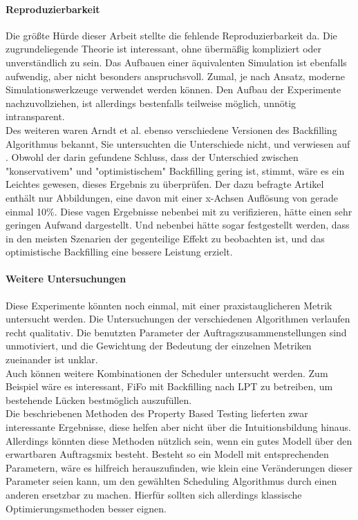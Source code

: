 \paragraph{Reproduzierbarkeit}
Die größte Hürde dieser Arbeit stellte die fehlende Reproduzierbarkeit da. Die zugrundeliegende Theorie ist interessant, ohne übermäßig kompliziert oder unverständlich zu sein. Das Aufbauen einer äquivalenten Simulation ist ebenfalls aufwendig, aber nicht besonders anspruchsvoll. Zumal, je nach Ansatz, moderne Simulationswerkzeuge verwendet werden können.
Den Aufbau der Experimente nachzuvollziehen, ist allerdings bestenfalls teilweise möglich, unnötig intransparent. \\
Des weiteren waren Arndt et al. ebenso verschiedene Versionen des Backfilling Algorithmus bekannt, Sie untersuchten die Unterschiede nicht, und verwiesen auf \cite{optVsCons}. Obwohl der darin gefundene Schluss, dass der Unterschied zwischen "konservativem" und "optimistischem" Backfilling gering ist, stimmt, wäre es ein Leichtes gewesen, dieses Ergebnis zu überprüfen. Der dazu befragte Artikel enthält nur Abbildungen, eine davon mit einer x-Achsen Auflösung von gerade einmal 10\%. Diese vagen Ergebnisse nebenbei mit zu verifizieren, hätte einen sehr geringen Aufwand dargestellt. Und nebenbei hätte sogar festgestellt werden, dass in den meisten Szenarien der gegenteilige Effekt zu beobachten ist, und das optimistische Backfilling eine bessere Leistung erzielt.

\paragraph{Weitere Untersuchungen}
Diese Experimente könnten noch einmal, mit einer praxistauglicheren Metrik untersucht werden. Die Untersuchungen der verschiedenen Algorithmen verlaufen recht qualitativ. Die benutzten Parameter der Auftragszusammenstellungen sind unmotiviert, und die Gewichtung der Bedeutung der einzelnen Metriken zueinander ist unklar.\\
Auch können weitere Kombinationen der Scheduler untersucht werden. Zum Beispiel wäre es interessant, FiFo mit Backfilling nach LPT zu betreiben, um bestehende Lücken bestmöglich auszufüllen.\\
Die beschriebenen Methoden des Property Based Testing lieferten zwar interessante Ergebnisse, diese helfen aber nicht über die Intuitionsbildung hinaus. Allerdings könnten diese Methoden nützlich sein, wenn ein gutes Modell über den erwartbaren Auftragsmix besteht. Besteht so ein Modell mit entsprechenden Parametern, wäre es hilfreich herauszufinden, wie klein eine Veränderungen dieser Parameter seien kann, um den gewählten Scheduling Algorithmus durch einen anderen ersetzbar zu machen. Hierfür sollten sich allerdings klassische Optimierungsmethoden besser eignen. 
